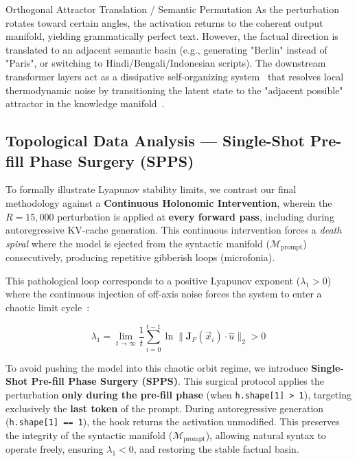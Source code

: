 \documentclass[10pt,journal,onecolumn]{article}
\begin{document}
\begin{subsection}{Orthogonal Attractor Translation / Semantic Permutation}
As the perturbation rotates toward certain angles, the activation returns to the coherent output manifold, yielding grammatically perfect text. However, the factual direction is translated to an adjacent semantic basin (e.g., generating "Berlin" instead of "Paris", or switching to Hindi/Bengali/Indonesian scripts). The downstream transformer layers act as a dissipative self-organizing system~\cite{prigogine1977self} that resolves local thermodynamic noise by transitioning the latent state to the "adjacent possible" attractor in the knowledge manifold~\cite{kauffman1993origins}.
\end{subsection}

\subsection{Topological Data Analysis --- Single-Shot Pre-fill Phase Surgery (SPPS)}
\label{sec:tda_gemma3}

To formally illustrate Lyapunov stability limits, we contrast our final methodology against a \textbf{Continuous Holonomic Intervention}, wherein the $R = 15,000$ perturbation is applied at \textbf{every forward pass}, including during autoregressive KV-cache generation. This continuous intervention forces a \textit{death spiral} where the model is ejected from the syntactic manifold ($\mathcal{M}_{\text{prompt}}$) consecutively, producing repetitive gibberish loops (microfonia). 

This pathological loop corresponds to a positive Lyapunov exponent ($\lambda_1 > 0$) where the continuous injection of off-axis noise forces the system to enter a chaotic limit cycle~\cite{kiwitt2026lyapunov}:

\begin{equation}
\lambda_1 = \lim_{t \to \infty} \frac{1}{t} \sum_{i=0}^{t-1} \ln \| \mathbf{J}_F(\vec{x}_i) \cdot \hat{u} \|_2 > 0
\label{eq:lyapunov_spectra}
\end{equation}

To avoid pushing the model into this chaotic orbit regime, we introduce \textbf{Single-Shot Pre-fill Phase Surgery (SPPS)}. This surgical protocol applies the perturbation \textbf{only during the pre-fill phase} (when \texttt{h.shape[1] > 1}), targeting exclusively the \textbf{last token} of the prompt. During autoregressive generation (\texttt{h.shape[1] == 1}), the hook returns the activation unmodified. This preserves the integrity of the syntactic manifold ($\mathcal{M}_{\text{prompt}}$), allowing natural syntax to operate freely, ensuring $\lambda_1 < 0$, and restoring the stable factual basin.
\end{document}
